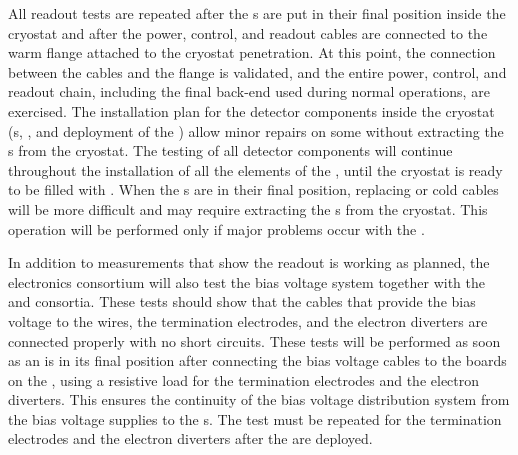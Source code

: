 All readout tests are repeated after the s are put
in their final position inside the cryostat and after the power, control, and
readout cables are connected to the warm flange attached to the cryostat
penetration. At this point, the connection between the cables and the flange
is validated, and the entire power, control, and readout chain, including the
final  back-end used during normal operations, are exercised. The
installation plan for the detector components inside the cryostat (s,
, and deployment of the ) allow minor repairs on some  without extracting
the s from the cryostat. The testing of all detector components
will continue throughout the installation of all the elements of the , 
until the cryostat is ready to be filled with .  When the 
s are in their final position, replacing  
or cold cables will be more difficult and may require extracting the s 
from the cryostat. This operation will be performed only if major problems occur with the .

In addition to measurements that show the 
readout is working as planned, the  electronics consortium will also
test the bias voltage system together with the 
and  consortia. These tests should show that
the cables that provide the bias voltage to the  wires, the
 termination electrodes, and the electron diverters are connected
properly with no short circuits. %
These tests will be performed as soon as an 
is in its final position after connecting the bias voltage cables to the 
 boards on the , using a resistive load for the 
 termination electrodes and the electron diverters. This ensures
the continuity of the bias voltage distribution system from the bias voltage
supplies to the s. The test must be repeated for the 
termination electrodes and the electron diverters after 
the  are deployed.

